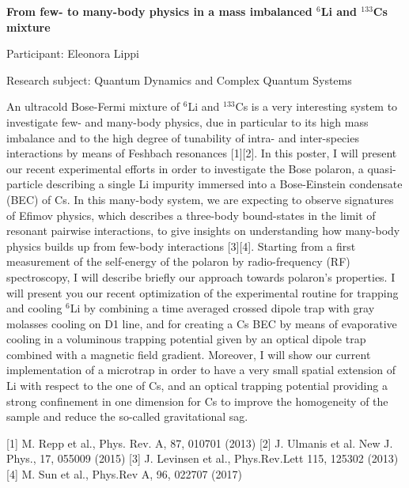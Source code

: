 \begin{minipage}[t]{1.0\textwidth}

\begin{center}

{{\large\bfseries From few- to many-body physics in a mass imbalanced $^{6}$Li and $^{133}$Cs mixture}\par}

\end{center}

{\noindent Participant: Eleonora Lippi\par} 

{\noindent Research subject: Quantum Dynamics and Complex Quantum Systems\par}\medskip

\noindent An ultracold Bose-Fermi mixture of $^{6}$Li and $^{133}$Cs is a very interesting system to investigate few- and many-body physics, due in particular to its high mass imbalance and to the high degree of tunability of intra- and inter-species interactions by means of Feshbach resonances [1][2]. 
In this poster, I will present our recent experimental efforts in order to investigate the Bose polaron, a quasi-particle describing a single Li impurity immersed into a Bose-Einstein condensate (BEC) of Cs. In this many-body system, we are expecting to observe signatures of Efimov physics, which describes a three-body bound-states in the limit of resonant pairwise interactions, to give insights on understanding how many-body physics builds up from few-body interactions [3][4].
Starting from a first measurement of the self-energy of the polaron by radio-frequency (RF) spectroscopy, I will describe briefly our approach towards polaron’s properties. I will present you our recent optimization of the experimental routine for trapping and cooling $^{6}$Li by combining a time averaged crossed dipole trap with gray molasses cooling on D1 line, and for creating a Cs BEC by means of evaporative cooling in a voluminous trapping potential given by an optical dipole trap combined with a magnetic field gradient. Moreover, I will show our current implementation of a microtrap in order to have a very small spatial extension of Li with respect to the one of Cs, and an optical trapping potential providing a strong confinement in one dimension for Cs to improve the homogeneity of the sample and reduce the so-called gravitational sag.

[1] M. Repp et al., Phys. Rev. A, 87, 010701 (2013)
[2] J. Ulmanis et al. New J. Phys., 17, 055009 (2015)
[3] J. Levinsen et al., Phys.Rev.Lett 115, 125302 (2013)
[4] M. Sun et al., Phys.Rev A, 96, 022707 (2017)

\par\end{minipage}

